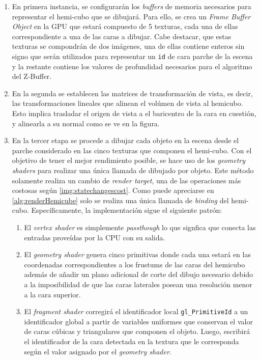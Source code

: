 \begin{enumerate}
	\item En primera instancia, se configurarán los \textit{buffers} de memoria necesarios para representar el hemi-cubo que se dibujará.
	Para ello, se crea un \textit{Frame Buffer Object} en la GPU que estará compuesto de 5 texturas, cada una de ellas correspondiente a una de las caras a dibujar. Cabe destacar, que estas texturas se compondrán de dos imágenes, una de ellas contiene enteros sin signo que serán utilizados para representar un \verb|id| de cara parche de la escena y la restante contiene los valores de profundidad necesarios para el algoritmo del Z-Buffer.
	\item En la segunda se establecen las matrices de transformación de vista, es decir, las transformaciones lineales que alinean el volúmen de vista al hemicubo. Esto implica trasladar el origen de vista a el baricentro de la cara en cuestión, y alinearla a su normal como se ve en la figura.
	\item En la tercer etapa se procede a dibujar cada objeto en la escena desde el parche considerado en las cinco texturas que componen el hemi-cubo. Con el objetivo de tener el mejor rendimiento posible, se hace uso de los \textit{geometry shaders} para realizar una única llamada de dibujado por objeto. Este método solamente realiza un cambio de \textit{render target}, una de las operaciones más costosas según \ref{img:statechangescost}. Como puede apreciarse en \ref{alg:renderHemicube} solo se realiza una única llamada de \textit{binding} del hemi-cubo. Específicamente, la implementación sigue el siguiente patrón:
	\begin{enumerate}
		\item El \textit{vertex shader} es simplemente \textit{passthough} lo que signfica que conecta las entradas proveídas por la CPU con su salida.
		\item El \textit{geometry shader} genera cinco primitivas donde cada una estará en las coordenadas correspondientes a los frustums de las caras del hemicubo además de añadir un plano adicional de corte del dibujo necesario debido a la imposibilidad de que las caras laterales posean una resolución menor a la cara superior.
		\item El \textit{fragment shader} corregirá el identificador local \verb|gl_PrimitiveId| a un identificador global a partir de variables uniformes que conservan el valor de caras cúbicas y triangulares que componen el objeto. Luego, escribirá el identificador de la cara detectada en la textura que le corresponda según el valor asignado por el \textit{geometry shader}.

\end{enumerate}
\end{enumerate}
